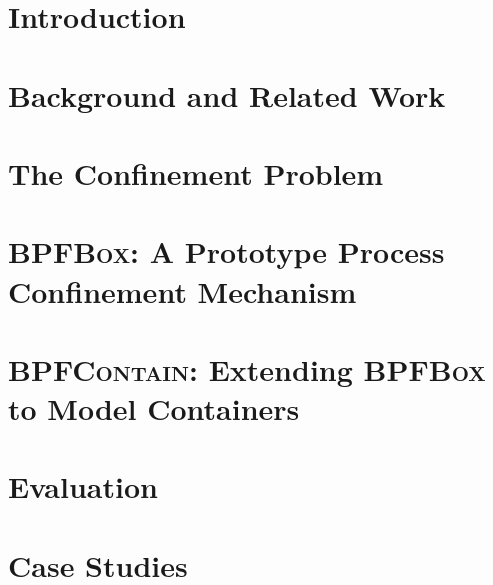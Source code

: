 \documentclass[
  fontsize=12pt,
  titlepage=firstiscover,
  paper=letter,
  oneside,
  cleardoublepage=plain,
  parskip=half-,
  DIV=10,
  parindent,
  appendixprefix,
  chapterprefix,
  listof=totoc,
]{scrbook}
\newcommand{\bpfbox}{\textsc{BPFBox}}
\newcommand{\bpfcontain}{\textsc{BPFContain}}
\begin{document}
\begingroup
\hypersetup{linkcolor=black}
\tableofcontents
\begin{singlespace}
\listoffigures
\listoftables
\lstlistoflistings
\end{singlespace}
\endgroup

\mainmatter%


\chapter{Introduction}%
\label{c:introduction}


\chapter{Background and Related Work}%
\label{c:background}


\chapter{The Confinement Problem}%
\label{c:confinement-problem}


\chapter{\bpfbox: A Prototype Process Confinement Mechanism}%
\label{c:bpfbox}


\chapter{\bpfcontain: Extending \bpfbox{} to Model Containers}%
\label{c:bpfcontain}


\chapter{Evaluation}%
\label{c:evaluation}


\chapter{Case Studies}%
\label{c:case-studies}

\end{document}
